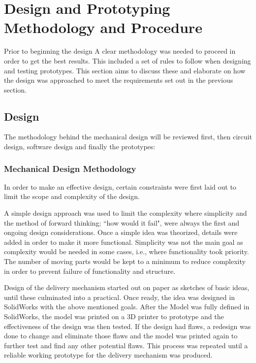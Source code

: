 \documentclass[a4paper,11pt]{article}
\numberwithin{figure}{section}
\numberwithin{table}{section}
\begin{document}
\section[Design and Prototyping Methodology and Procedure]{Design and Prototyping Methodology and Procedure%
}
Prior to beginning the design A clear methodology was needed to proceed in order to get the best results. This included a set of rules to follow when designing and testing prototypes. This section aims to discuss these and elaborate on how the design was approached to meet the requirements set out in the previous section.

\subsection{Design}
The methodology behind the mechanical design will be reviewed first, then circuit design, software design and finally the prototypes:
\subsubsection{Mechanical Design Methodology}
In order to make an effective design, certain constraints were first laid out to limit the scope and complexity of the design.

A simple design approach was used to limit the complexity where simplicity and the method of forward thinking; ``how would it fail", were always the first and ongoing design considerations. Once a simple idea was theorized, details were added in order to make it more functional. Simplicity was not the main goal as complexity would be needed in some cases, i.e., where functionality took priority. The number of moving parts would be kept to a minimum to reduce complexity in order to prevent failure of functionality and structure. 

Design of the delivery mechanism started out on paper as sketches of basic ideas, until these culminated into a practical. Once ready, the idea was designed in SolidWorks with the above mentioned goals. After the Model was fully defined in SolidWorks, the model was printed on a 3D printer to prototype and the effectiveness of the design was then tested. If the design had flaws, a redesign was done to change and eliminate those flaws and the model was printed again to further test and find any other potential flaws. This process was repeated until a reliable working prototype for the delivery mechanism was produced.
\end{document}
